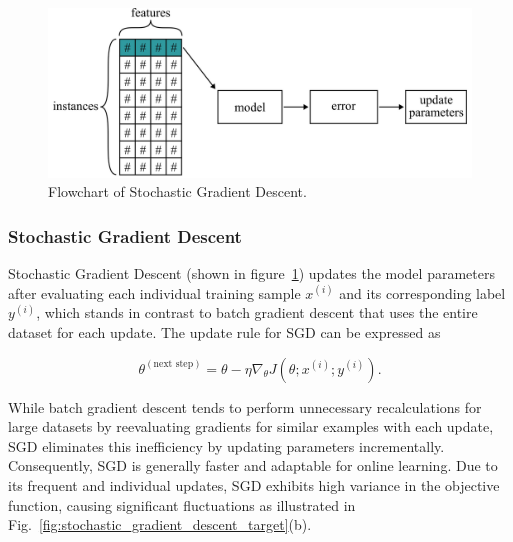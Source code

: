 \documentclass[12pt,letter]{article}
\begin{document}
\begin{figure}[h]
	\centering
	\includegraphics[width=5.4in]{../figures/gradient_descent_stochastic}
	\caption{Flowchart of Stochastic Gradient Descent.}
	\label{fig:gradient_descent_stochastic}
\end{figure}


\subsubsection{Stochastic Gradient Descent}



Stochastic Gradient Descent (shown in figure~\ref{fig:gradient_descent_stochastic}) updates the model parameters after evaluating each individual training sample $x^{(i)}$ and its corresponding label $y^{(i)}$, which stands in contrast to batch gradient descent that uses the entire dataset for each update. The update rule for SGD can be expressed as



\begin{equation}
\theta^{(\text{next step})} = \theta - \eta \nabla_\theta J(\theta; x^{(i)}; y^{(i)}).
\end{equation}

While batch gradient descent tends to perform unnecessary recalculations for large datasets by reevaluating gradients for similar examples with each update, SGD eliminates this inefficiency by updating parameters incrementally. Consequently, SGD is generally faster and adaptable for online learning.
Due to its frequent and individual updates, SGD exhibits high variance in the objective function, causing significant fluctuations as illustrated in Fig.~\ref{fig:stochastic_gradient_descent_target}(b).
\end{document}
